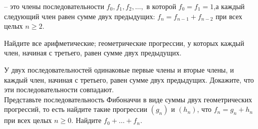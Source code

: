 \documentclass[a4paper,11pt]{article}
\begin{document}
\vspace*{-5pt}


 -- это члены последовательности
$f_0,f_1,f_2,\ldots,$
в которой $f_0=f_1=1$,\break а
каждый следующий член равен сумме двух предыдущих:
$f_{n}=f_{n-1}+f_{n-2}$ при всех целых $n\geq2$.



 Найдите все
арифметические;
геометрические прогрессии, у которых каждый член,
начиная с третьего, равен сумме двух предыдущих.


 У двух последовательностей одинаковые первые члены и вторые члены, и каждый член, начиная с третьего, равен сумме двух предыдущих. Докажите,
что эти последовательности совпадают.\\
Представьте последовательность Фибоначчи в виде
суммы двух геометрических прогрессий,
то есть найдите такие прогрессии $(g_n)$ и $(h_n)$, что $f_n=g_n+h_n$ при
всех целых $n\geq0$.  %
 Найдите $f_0+\ldots+f_n$.

\end{document}
